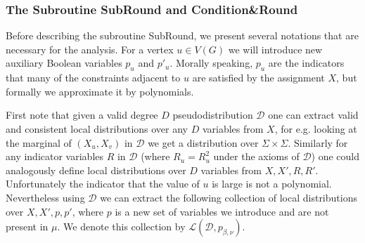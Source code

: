 \documentclass[11pt]{article}
\def \cD {\mathcal{D}}
\def \cL {\mathcal{L}}
\theoremstyle{definition}
\begin{document}
\subsubsection{The Subroutine SubRound and Condition\&Round}
Before describing the subroutine SubRound, 
we present several notations that are necessary for the analysis. For a vertex $u\in V(G)$ we will introduce new auxiliary Boolean variables $p_u$ and $p'_u$.  Morally speaking, $p_u$ are the indicators
that many of the constraints adjacent to $u$ are satisfied by the assignment $X$, but formally 
we approximate it by polynomials. 

First note that given a valid degree $D$ pseudodistribution $\cD$ one can extract valid and consistent local distributions over any $D$ variables from $X$, for e.g. looking at the marginal of $(X_u,X_v)$ in $\cD$ we get a distribution over $\Sigma \times \Sigma$. Similarly for any indicator variables $R$ in $\cD$ (where $R_u = R_u^2$ under the axioms of $\cD$) one could analogously define local distributions over $D$ variables from $X,X',R,R'$. Unfortunately the indicator that the value of $u$ is large is not a polynomial. Nevertheless using $\cD$ we can extract the following collection of local distributions over $X,X',p,p'$, where $p$ is a new set of variables we introduce and are not present in $\mu$. We denote this collection by $\cL(\cD, p_{\beta,\nu})$.
\end{document}
